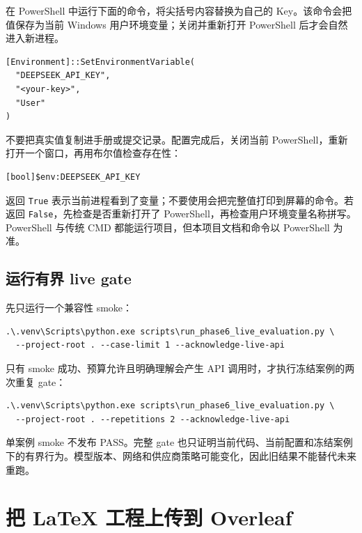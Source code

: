 在 PowerShell 中运行下面的命令，将尖括号内容替换为自己的 Key。该命令会把值保存为当前 Windows 用户环境变量；关闭并重新打开 PowerShell 后才会自然进入新进程。

\begin{lstlisting}[language={}]
[Environment]::SetEnvironmentVariable(
  "DEEPSEEK_API_KEY",
  "<your-key>",
  "User"
)
\end{lstlisting}

不要把真实值复制进手册或提交记录。配置完成后，关闭当前 PowerShell，重新打开一个窗口，再用布尔值检查存在性：

\begin{lstlisting}[language={}]
[bool]$env:DEEPSEEK_API_KEY
\end{lstlisting}

返回 \texttt{True} 表示当前进程看到了变量；不要使用会把完整值打印到屏幕的命令。若返回 \texttt{False}，先检查是否重新打开了 PowerShell，再检查用户环境变量名称拼写。PowerShell 与传统 CMD 都能运行项目，但本项目文档和命令以 PowerShell 为准。

\subsection{运行有界 live gate}

先只运行一个兼容性 smoke：

\begin{lstlisting}[language={}]
.\.venv\Scripts\python.exe scripts\run_phase6_live_evaluation.py \
  --project-root . --case-limit 1 --acknowledge-live-api
\end{lstlisting}

只有 smoke 成功、预算允许且明确理解会产生 API 调用时，才执行冻结案例的两次重复 gate：

\begin{lstlisting}[language={}]
.\.venv\Scripts\python.exe scripts\run_phase6_live_evaluation.py \
  --project-root . --repetitions 2 --acknowledge-live-api
\end{lstlisting}

\begin{boundarybox}
单案例 smoke 不发布 PASS。完整 gate 也只证明当前代码、当前配置和冻结案例下的有界行为。模型版本、网络和供应商策略可能变化，因此旧结果不能替代未来重跑。
\end{boundarybox}

\section{把 LaTeX 工程上传到 Overleaf}


